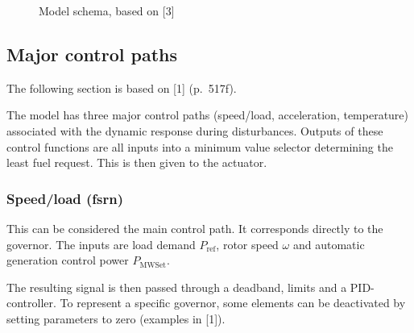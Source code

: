 \documentclass[
  a4paper,
  DIV=11,
  numbers=noendperiod]{scrartcl}
\begin{document}
\begin{figure}


\caption{\label{fig-modelSchema}Model schema, based on {[}3{]}}

\end{figure}%

\subsection{Major control paths}\label{major-control-paths}

The following section is based on {[}1{]} (p.~517f).

The model has three major control paths (speed/load, acceleration,
temperature) associated with the dynamic response during disturbances.
Outputs of these control functions are all inputs into a minimum value
selector determining the least fuel request. This is then given to the
actuator.

\subsubsection{Speed/load (fsrn)}\label{speedload-fsrn}

This can be considered the main control path. It corresponds directly to
the governor. The inputs are load demand \(P_\mathrm{ref}\), rotor speed
\(\omega\) and automatic generation control power \(P_\mathrm{MWSet}\).

The resulting signal is then passed through a deadband, limits and a
PID-controller. To represent a specific governor, some elements can be
deactivated by setting parameters to zero (examples in {[}1{]}).
\end{document}

